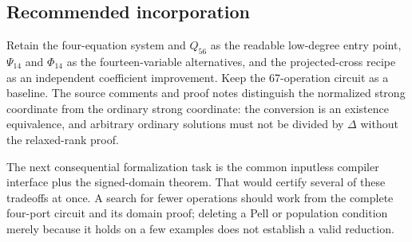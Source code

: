 \documentclass[11pt,a4paper]{article}
\theoremstyle{remark}\newtheorem{remark}[theorem]{Remark}
\begin{document}
\subsection{Recommended incorporation}

Retain the four-equation system and \(Q_{56}\) as the readable low-degree
entry point, \(\Psi_{14}\) and \(\Phi_{14}\) as the fourteen-variable
alternatives, and the projected-cross recipe as an independent coefficient
improvement. Keep the 67-operation circuit as a baseline. The source
comments and proof notes distinguish the normalized strong coordinate
from the ordinary strong coordinate: the conversion is an existence
equivalence, and arbitrary ordinary solutions must not be divided by
\(\Delta\) without the relaxed-rank proof.

The next consequential formalization task is the common inputless
compiler interface plus the signed-domain theorem. That would certify
several of these tradeoffs at once. A search for fewer operations should
work from the complete four-port circuit and its domain proof; deleting a
Pell or population condition merely because it holds on a few examples
does not establish a valid reduction.
\end{document}
